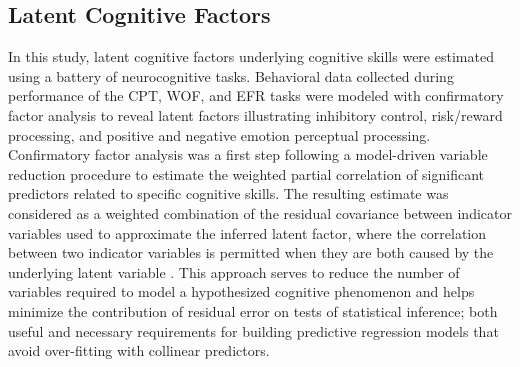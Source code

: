\documentclass{article}%
\begin{document}
\subsection*{Latent Cognitive Factors} In this study, latent cognitive factors underlying cognitive skills were estimated using a battery of neurocognitive tasks. Behavioral data collected during performance of the CPT, WOF, and EFR tasks were modeled with confirmatory factor analysis to reveal latent factors illustrating inhibitory control, risk/reward processing, and positive and negative emotion perceptual processing. Confirmatory factor analysis was a first step following a model-driven variable reduction procedure to estimate the weighted partial correlation of significant predictors related to specific cognitive skills. The resulting estimate was considered as a weighted combination of the residual covariance between indicator variables used to approximate the inferred latent factor, where the correlation between two indicator variables is permitted when they are both caused by the underlying latent variable \citep{cooper2019neuroimaging}. This approach serves to reduce the number of variables required to model a hypothesized cognitive phenomenon and helps minimize the contribution of residual error on tests of statistical inference; both useful and necessary requirements for building predictive regression models that avoid over-fitting with collinear predictors. 
%
\end{document}
